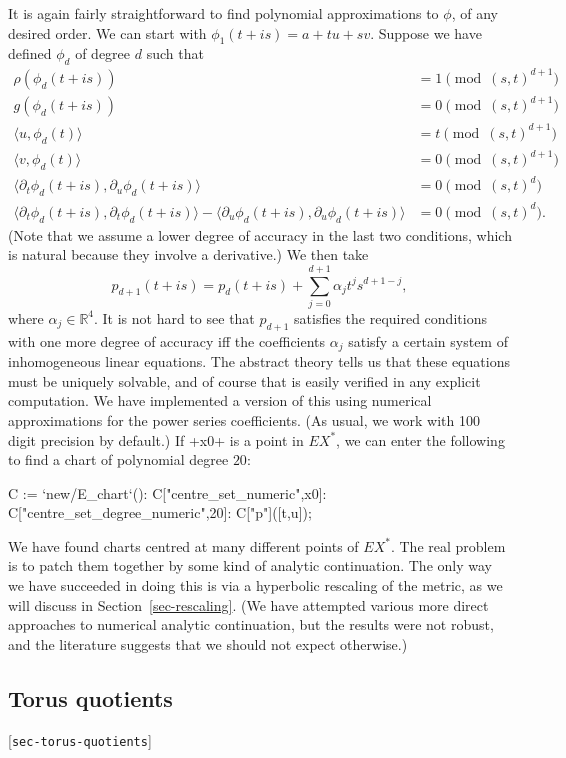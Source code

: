 \documentclass[reqno]{amsart}
\newcommand{\lbl}[1]{\label{#1}\textup{[\texttt{#1}]}\par}
\newcommand{\lbl}{\label}
\newcommand{\al}        {\alpha}
\newcommand{\R}         {{\mathbb{R}}}
\newcommand{\ip}[1]     {\langle #1\rangle}
\renewcommand{\:}{\colon}
\theoremstyle{definition}
\begin{document}
It is again fairly straightforward to find polynomial approximations
to $\phi$, of any desired order.  We can start with
$\phi_1(t+is)=a+tu+sv$.  Suppose we have defined $\phi_d$ of degree
$d$ such that
\begin{align*}
 \rho(\phi_d(t+is)) &= 1 \pmod{(s,t)^{d+1}} \\
 g(\phi_d(t+is)) &= 0 \pmod{(s,t)^{d+1}} \\
 \ip{u,\phi_d(t)} &= t \pmod{(s,t)^{d+1}} \\
 \ip{v,\phi_d(t)} &= 0 \pmod{(s,t)^{d+1}} \\
 \ip{\partial_t\phi_d(t+is),\partial_u\phi_d(t+is)}
  &= 0 \pmod{(s,t)^d} \\
 \ip{\partial_t\phi_d(t+is),\partial_t\phi_d(t+is)} -
 \ip{\partial_u\phi_d(t+is),\partial_u\phi_d(t+is)}
  &= 0 \pmod{(s,t)^d}.
\end{align*}
(Note that we assume a lower degree of accuracy in the last two
conditions, which is natural because they involve a derivative.)  We
then take
\[ p_{d+1}(t+is)=p_d(t+is) + \sum_{j=0}^{d+1}\al_jt^js^{d+1-j}, \]
where $\al_j\in\R^4$.  It is not hard to see that $p_{d+1}$ satisfies
the required conditions with one more degree of accuracy iff the
coefficients $\al_j$ satisfy a certain system of inhomogeneous linear
equations.  The abstract theory tells us that these equations must be
uniquely solvable, and of course that is easily verified in any
explicit computation.  We have implemented a version of this using
numerical approximations for the power series coefficients.  (As
usual, we work with 100 digit precision by default.)  If \mcode+x0+ is a
point in $EX^*$, we can enter the following to find a chart of
polynomial degree $20$:
\begin{mcodeblock}
   C := `new/E_chart`():
   C["centre_set_numeric",x0]:
   C["centre_set_degree_numeric",20]:
   C["p"]([t,u]);
\end{mcodeblock}

We have found charts centred at many different points of $EX^*$.  The
real problem is to patch them together by some kind of analytic
continuation.  The only way we have succeeded in doing this is via a
hyperbolic rescaling of the metric, as we will discuss in
Section~\ref{sec-rescaling}.  (We have attempted various more direct
approaches to numerical analytic continuation, but the results were
not robust, and the literature suggests that we should not expect
otherwise.)

\subsection{Torus quotients}
\lbl{sec-torus-quotients}
\end{document}
